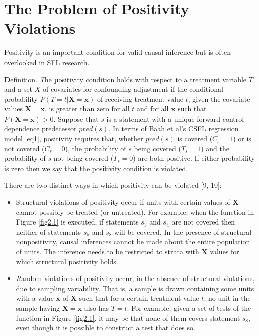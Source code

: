 \section{The Problem of Positivity Violations}\label{sec2}
Positivity \cite{hernan2006estimating} is an important condition for valid causal inference but is often overlooked in SFL research.

{\textbf Definition.}  {\textit The {\textbf positivity} condition  holds with respect to a treatment variable $T$ and a set $X$ of covariates for confounding adjustment if the conditional probability $P(T=t|\mathbf{X=x})$ of receiving treatment value $t$, given the covariate values $\mathbf{X=x}$, is greater than zero for all $t$ and for all $\mathbf{x}$ such that $P(\mathbf{X=x})>0$.}
Suppose that $s$ is a statement with a unique forward control dependence predecessor $pred(s)$.  In terms of Baah et al's CSFL regression model \eqref{eq1}, positivity requires that, whether $pred(s)$ is covered ($C_s=1$) or is not covered ($C_s=0$), the probability of $s$ being covered ($T_s=1$) and the probability of $s$ not being covered ($T_s=0$) are both positive.  If either probability is zero then we say that the positivity condition is violated.

There are two distinct ways in which positivity can be violated [9, 10]:
\begin{itemize}
\item Structural violations of positivity occur if units with certain values of $\mathbf{X}$ cannot possibly be treated (or untreated).   For example, when the function in Figure \ref{fig2.1} is executed, if statements $s_3$ and $s_4$ are not covered then neither of statements $s_5$ and $s_8$ will be covered.  In the presence of structural nonpositivity, causal inferences cannot be made about the entire population of units.  The inference needs to be restricted to strata with $\mathbf{X}$ values for which structural positivity holds.

\item {\textit Random violations} of positivity occur, in the absence of structural violations, due to sampling variability. That is, a sample is drawn containing some units with a value $\mathbf{x}$ of $\mathbf{X}$ such that for a certain treatment value $t$, no unit in the sample having $\mathbf{X=x}$ also has $T=t$.   For example, given a set of tests of the function in Figure \ref{fig2.1}, it may be that none of them covers statement $s_8$, even though it is possible to construct a test that does so.
\end{itemize}

